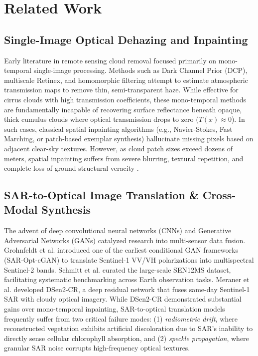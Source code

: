 \section{Related Work}
\label{sec:related}

\subsection{Single-Image Optical Dehazing and Inpainting}
Early literature in remote sensing cloud removal focused primarily on mono-temporal single-image processing. Methods such as Dark Channel Prior (DCP), multiscale Retinex, and homomorphic filtering attempt to estimate atmospheric transmission maps to remove thin, semi-transparent haze. While effective for cirrus clouds with high transmission coefficients, these mono-temporal methods are fundamentally incapable of recovering surface reflectance beneath opaque, thick cumulus clouds where optical transmission drops to zero ($T(x) \approx 0$). In such cases, classical spatial inpainting algorithms (e.g., Navier-Stokes, Fast Marching, or patch-based exemplar synthesis) hallucinate missing pixels based on adjacent clear-sky textures. However, as cloud patch sizes exceed dozens of meters, spatial inpainting suffers from severe blurring, textural repetition, and complete loss of ground structural veracity \cite{valenta2021cloud}.

\subsection{SAR-to-Optical Image Translation \& Cross-Modal Synthesis}
The advent of deep convolutional neural networks (CNNs) and Generative Adversarial Networks (GANs) \cite{isola2017image} catalyzed research into multi-sensor data fusion. Grohnfeldt et al. \cite{grohnfeldt2018conditional} introduced one of the earliest conditional GAN frameworks (SAR-Opt-cGAN) to translate Sentinel-1 VV/VH polarizations into multispectral Sentinel-2 bands. Schmitt et al. \cite{schmitt2019sen12ms} curated the large-scale SEN12MS dataset, facilitating systematic benchmarking across Earth observation tasks. Meraner et al. \cite{meraner2020cloud} developed DSen2-CR, a deep residual network that fuses same-day Sentinel-1 SAR with cloudy optical imagery. While DSen2-CR demonstrated substantial gains over mono-temporal inpainting, SAR-to-optical translation models frequently suffer from two critical failure modes: (1) \textit{radiometric drift}, where reconstructed vegetation exhibits artificial discoloration due to SAR's inability to directly sense cellular chlorophyll absorption, and (2) \textit{speckle propagation}, where granular SAR noise corrupts high-frequency optical textures.

